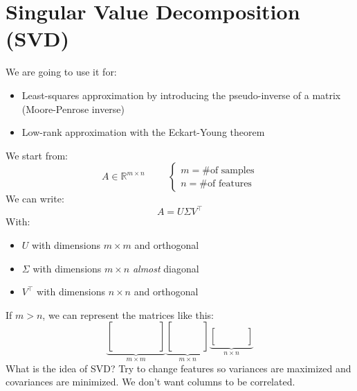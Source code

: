 

\section{Singular Value Decomposition (SVD)}
We are going to use it for:
\begin{itemize}
    \item Least-squares approximation by introducing the pseudo-inverse of a matrix (Moore-Penrose inverse)
    \item Low-rank approximation with the Eckart-Young theorem
\end{itemize}
We start from:
\[
A \in \mathbb{R}^{m \times n} \hspace{1cm} 
\begin{cases}
m = \text{\# of samples}\\
n = \text{\# of features}
\end{cases}    
\]
We can write:
\[
    A = U\Sigma V^\intercal    
\]
With:
\begin{itemize}
    \item $U$ with dimensions $m \times m$ and orthogonal
    \item $\Sigma$ with dimensions $m \times n$ \textit{almost} diagonal
    \item $V^\intercal$ with dimensions $n \times n$ and orthogonal
\end{itemize}
If $m > n$, we can represent the matrices like this:
\[
\underbrace{
  \begin{bmatrix}
    & & & & & \\
    & & & & & \\
    & & & & & \\
    & & & & & \\
    & & & & & \\
  \end{bmatrix}}_{m \times m}
\underbrace{
  \begin{bmatrix}
    & & & \\
    & & & \\
    & & & \\
    & & & \\
    & & & \\
  \end{bmatrix}}_{m \times n}
\underbrace{
  \begin{bmatrix}
    & & & \\
    & & & \\
    & & & \\
  \end{bmatrix}}_{n \times n}
\]
What is the idea of SVD? Try to change features so variances are maximized and covariances are minimized. We don't want columns to be correlated.\\

